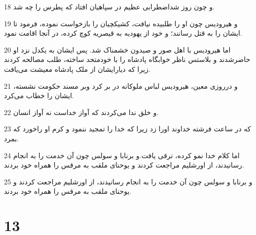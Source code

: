 \par 18 و چون روز شداضطرابی عظیم در سپاهیان افتاد که پطرس را چه شد.
\par 19 و هیرودیس چون او را طلبیده نیافت، کشیکچیان را بازخواست نموده، فرمود تا ایشان را به قتل رسانند؛ و خود از یهودیه به قیصریه کوچ کرده، در آنجا اقامت نمود.
\par 20 اما هیرودیس با اهل صور و صیدون خشمناک شد. پس ایشان به یکدل نزد او حاضرشدند و بلاستس ناظر خوابگاه پادشاه را با خودمتحد ساخته، طلب مصالحه کردند زیرا که دیارایشان از ملک پادشاه معیشت می‌یافت.
\par 21 و درروزی معین، هیرودیس لباس ملوکانه در بر کرد وبر مسند حکومت نشسته، ایشان را خطاب می‌کرد.
\par 22 و خلق ندا می‌کردند که آواز خداست نه آواز انسان.
\par 23 که در ساعت فرشته خداوند اورا زد زیرا که خدا را تمجید ننمود و کرم او راخورد که بمرد.
\par 24 اما کلام خدا نمو کرده، ترقی یافت.و برنابا و سولس چون آن خدمت را به انجام رسانیدند، از اورشلیم مراجعت کردند و یوحنای ملقب به مرقس را همراه خود بردند.
\par 25 و برنابا و سولس چون آن خدمت را به انجام رسانیدند، از اورشلیم مراجعت کردند و یوحنای ملقب به مرقس را همراه خود بردند.

\chapter{13}

